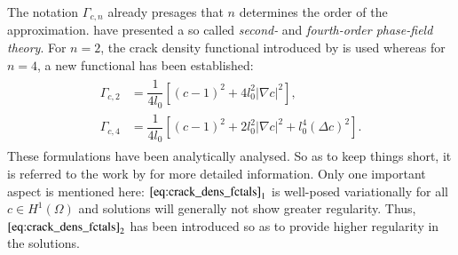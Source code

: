 The notation $\Gamma_{c,n}$ already presages that $n$ determines the order of the approximation. \citet{02_PF_HO_brittle} have presented a so called \textit{second-} and \textit{fourth-order phase-field theory}. For $n=2$, the crack density functional introduced by \citet{08_PF_Gammac2} is used whereas for $n=4$, a new functional has been established:
\begin{align}
	\begin{aligned}   \label{eq:crack_dens_fctals}
		\Gamma_{c,2} &= \dfrac{1}{4l_{0}}\left[\left(c-1\right)^{2}+4l_{0}^{2}|\nabla c|^{2}\right], \\
		\Gamma_{c,4} &= \dfrac{1}{4l_{0}}\left[\left(c-1\right)^{2}+2l_{0}^{2}|\nabla c|^{2}+l_{0}^{4}\left(\Delta c\right)^{2}\right].
	\end{aligned}
\end{align}
These formulations have been analytically analysed. So as to keep things short, it is referred to the work by \citet{02_PF_HO_brittle} for more detailed information. Only one important aspect is mentioned here: ${\eqref{eq:crack_dens_fctals}}_{1}$ is well-posed variationally for all $c\in H^{1}\left(\Omega\right)$ and solutions will generally not show greater regularity. Thus, ${\eqref{eq:crack_dens_fctals}}_{2}$ has been introduced so as to provide higher regularity in the solutions.

